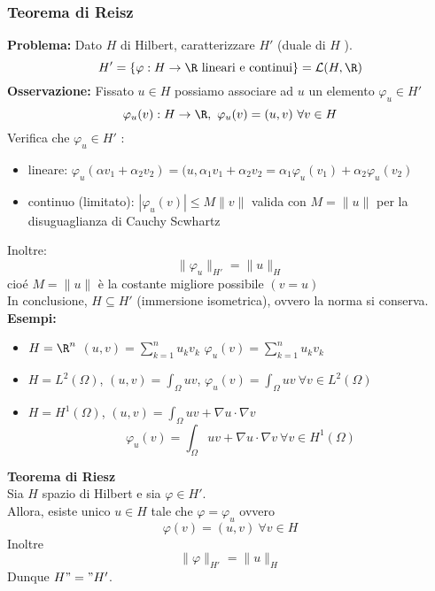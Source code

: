 \subsubsection{Teorema di Reisz}
\textbf{Problema:} Dato $H$ di Hilbert, caratterizzare $H'$ (duale di $H$ ).
\[H'=\{\varphi:H\to \R\text{ lineari e continui}\} =\mathcal L(H,\R)\]
\textbf{Osservazione:} Fissato $u\in H$ possiamo associare ad $u$ un elemento $\varphi_u\in H'$ 
\[\varphi_u(v):H\to \R,\ \varphi_u(v)=(u,v)\ \forall v\in H\]
Verifica che $\varphi_u\in H'$ :
\begin{itemize}
	\item lineare: $\varphi_u(\alpha v_1+\alpha_2v_2)=(u,\alpha_1v_1+\alpha_2v_2=\alpha_1\varphi_u(v_1)+\alpha_2\varphi_u(v_2)$
	\item continuo (limitato): $|\varphi_u(v)|\le M \|v\|$ valida con $M=\|u\|$ per la disuguaglianza di Cauchy Scwhartz

\end{itemize}
Inoltre:
\[\|\varphi_u\|_{H'}=\|u\|_H\]
cioé $M=\|u\|$ è la costante migliore possibile $(v=u)$
\\In conclusione, $H\subseteq  H'$ (immersione isometrica), ovvero la norma si conserva.
\\\textbf{Esempi:} 
\begin{itemize}
	\item $H=\R^n$  $(u,v)=\sum_{k=1}^{n} u_kv_k$  $\varphi_u(v)=\sum_{k=1}^{n} u_kv_k$ 
	\item $H=L^{2}(\Omega)$,  $(u,v)=\int_{\Omega}^{} uv $, $\varphi_u(v)=\int_{\Omega}^{} uv \ \forall v\in L^{2}(\Omega)$
	\item $H=H^1(\Omega)$, $(u,v)=\int_{\Omega}^{} uv+\nabla u\cdot \nabla v $
		\[\varphi_u(v)=\int_{\Omega}^{} uv+\nabla u\cdot \nabla v \ \forall v\in H^1(\Omega)\] 
\end{itemize} 

\begin{tcolorbox}
\textbf{Teorema di Riesz }
\\Sia $H$ spazio di Hilbert e sia $\varphi\in H'$.
\\Allora, esiste unico  $u\in H$ tale che $\varphi=\varphi_u$ ovvero
\[\varphi(v)=(u,v)\ \forall v\in H\]
Inoltre
\[\|\varphi\|_{H'}=\|u\|_H\]
Dunque $H"="H'$.
\end{tcolorbox}
